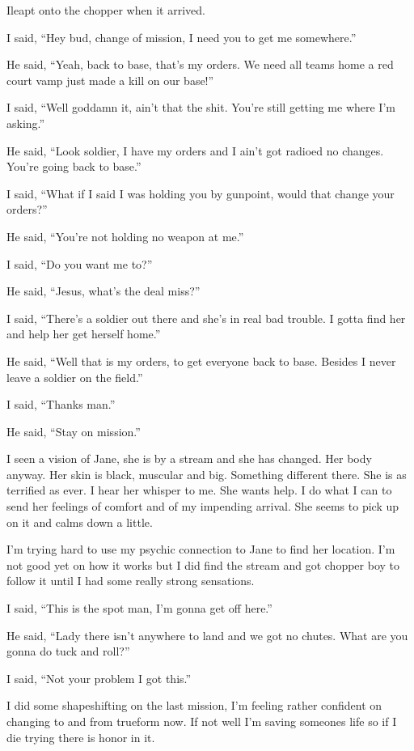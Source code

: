 \lettrine[lines=2,lraise=0]{I}\space leapt onto the chopper when it arrived.

I said, ``Hey bud, change of mission, I need you to get me somewhere.''

He said, ``Yeah, back to base, that's my orders. We need all teams home a red court vamp just made a kill on our base!''

I said, ``Well goddamn it, ain't that the shit. You're still getting me where I'm asking.''

He said, ``Look soldier, I have my orders and I ain't got radioed no changes. You're going back to base.''

I said, ``What if I said I was holding you by gunpoint, would that change your orders?''

He said, ``You're not holding no weapon at me.''

I said, ``Do you want me to?''

He said, ``Jesus, what's the deal miss?''

I said, ``There's a soldier out there and she's in real bad trouble. I gotta find her and help her get herself home.''

He said, ``Well that is my orders, to get everyone back to base. Besides I never leave a soldier on the field.''

I said, ``Thanks man.''

He said, ``Stay on mission.''


I seen a vision of Jane, she is by a stream and she has changed. Her body anyway. Her skin is black, muscular and big. Something different there. She is as terrified as ever. I hear her whisper to me. She wants help. I do what I can to send her feelings of comfort and of my impending arrival. She seems to pick up on it and calms down a little.

\parasep

I'm trying hard to use my psychic connection to Jane to find her location. I'm not good yet on how it works but I did find the stream and got chopper boy to follow it until I had some really strong sensations.

I said, ``This is the spot man, I'm gonna get off here.''

He said, ``Lady there isn't anywhere to land and we got no chutes. What are you gonna do tuck and roll?''

I said, ``Not your problem I got this.''

I did some shapeshifting on the last mission, I'm feeling rather confident on changing to and from trueform now. If not well I'm saving someones life so if I die trying there is honor in it.


